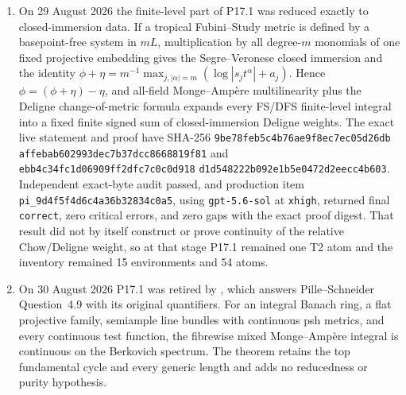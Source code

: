 \begin{enumerate}
  and DXZ inputs, not a novelty or priority claim.  The exact-live statement
  and proof have SHA-256
  \texttt{949819c48c8d0e991acbb92ed7c15d50}
  \allowbreak\texttt{4dd691056f06553c58ac1d4ab564d33e} and
  \texttt{58c2954ad1e541ab41e0649c4e84e222}
  \allowbreak\texttt{52299265b422159df41fe5772f2e8064}.
  They passed the superseding archive
  \texttt{p001\_mp\_bj\_full\_cone\_live\_run2\_20260828}, verdict
  \texttt{correct}, zero critical errors, and zero gaps.  The
  inventory at that stage was 15 formal problem environments and 54 active
  atoms, with tier counts \(0,6,14,17,17\).
\item On 29 August 2026 the finite-level part of P17.1 was reduced exactly
  to closed-immersion data.  If a tropical Fubini--Study metric is defined
  by a basepoint-free system in \(mL\), multiplication by all degree-\(m\)
  monomials of one fixed projective embedding gives the Segre--Veronese
  closed immersion and the identity
  \(\phi+\eta=m^{-1}\max_{j,|\alpha|=m}
  (\log|s_jt^\alpha|+a_j)\).  Hence
  \(\phi=(\phi+\eta)-\eta\), and all-field Monge--Amp\`ere
  multilinearity plus the Deligne change-of-metric formula expands every
  FS/DFS finite-level integral into a fixed finite signed sum of
  closed-immersion Deligne weights.  The exact live statement and proof have
  SHA-256
  \texttt{9be78feb5c4b76ae9f8ec7ec05d26db}
  \allowbreak\texttt{affebab602993dec7b37dcc8668819f81} and
  \texttt{ebb4c34fc1d06909ff2dfc7c0c0d918}
  \allowbreak\texttt{d1d548222b092e1b5e0472d2eecc4b603}.
  Independent exact-byte audit passed, and production item
  \texttt{pi\_9d4f5f4d6c4a36b32834c0a5}, using
  \texttt{gpt-5.6-sol} at \texttt{xhigh}, returned final
  \texttt{correct}, zero critical errors, and zero gaps with the exact proof
  digest.  That result did not by itself construct or prove continuity of the
  relative Chow/Deligne weight, so at that stage P17.1 remained one T2 atom
  and the inventory remained 15 environments and 54 atoms.
\item On 30 August 2026 P17.1 was retired by
  , which answers Pille--Schneider
  Question~4.9 with its original quantifiers.  For an integral Banach ring,
  a flat projective family, semiample line bundles with continuous psh
  metrics, and every continuous test function, the fibrewise mixed
  Monge--Amp\`ere integral is continuous on the Berkovich spectrum.  The
  theorem retains the top fundamental cycle and every generic length and
  adds no reducedness or purity hypothesis.


\end{enumerate}

